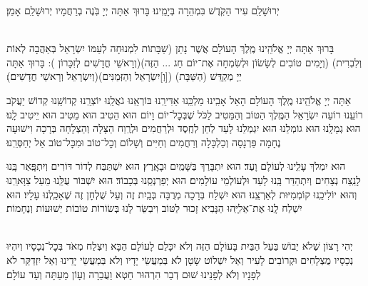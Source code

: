 \documentclass[twoside, openany, parskip=half, 11pt]{book}
\begin{document}
יְרוּשָׁלַ‍ִם עִיר הַקֹּֽדֶשׁ בִּמְהֵרָה בְּיָמֵֽינוּ׃ בָּרוּךְ אַתָּה יְיָ בֹּֽנֶה בְרַחֲמָיו יְרוּשָׁלַ‍ִם אָמֵן׃

\begin{sometimes}

\\
בָּרוּךְ אַתָּה יְיָ אֱלֹהֵֽינוּ מֶֽלֶךְ הָעוֹלָם אֲשֶׁר נָתַן (שַׁבָּתוֹת לִמְנוּחָה לְעַמּוֹ יִשְׂרָאֵל בְּאַהֲבָה לְאוֹת וְלִבְרִית)
(וְיָמִים טוֹבִים לְשָׂשׂוֹן וּלְשִׂמְחָה אֶת־יוֹם חַג ... הַזֶּה)(וְרָאשֵׁי חֳדָשִׁים לְזִכָּרוֹן ):
בָּרוּךְ אַתָּה יְיָ מְקַדֵּשׁ (הַשַּׁבָּת) ([וְ]יִשְׂרָאֵל וְהַזְּמַנִּים)(וְיִשְׂרָאֵל וְרָאשֵׁי חֳדָשִׁים׃)׃

\end{sometimes}


אַתָּה יְיָ אֱלֹהֵֽינוּ מֶֽלֶךְ הָעוֹלָם הָאֵל אָבִֽינוּ מַלְכֵּֽנוּ אַדִּירֵֽנוּ בּוֹרְאֵֽנוּ גֹאֲלֵֽנוּ יוֹצְרֵֽנוּ קְדוֹשֵֽׁנוּ קְדוֹשׁ יַעֲקֹב רוֹעֵֽנוּ רוֹעֵה יִשְׂרָאֵל הַמֶּֽלֶךְ הַטּוֹב וְהַמֵּטִיב לַכֹּל שֶׁבְּכׇל־יוֹם וָיוֹם הוּא הֵטִיב הוּא מֵטִיב הוּא יֵיטִיב לָֽנוּ׃ הוּא גְמָלָֽנוּ הוּא גוֹמְלֵנוּ הוּא יִגְמְלֵנוּ לָעַד לְחֵן לְחֶֽסֶד וּלְרַחֲמִים וּלְרֶֽוַח הַצָּלָה וְהַצְלָחָה בְּרָכָה וִישׁוּעָה נֶחָמָה פַּרְנָסָה וְכַלְכָּלָה וְרַחֲמִים וְחַיִּים וְשָׁלוֹם וְכׇל־טוֹב וּמִכׇּל־טוֹב אַל יְחַסְּרֵֽנוּ׃

הוּא יִמְלֹךְ עָלֵֽינוּ לְעוֹלָם וָעֶד׃
הוּא יִתְבָּרַךְ בַּשָּׁמַֽיִם וּבָאָֽרֶץ׃
הוּא יִשְׁתַּבַּח לְדוֹר דּוֹרִים וְיִתְפָּֽאַר בָּֽנוּ לָנֵֽצַח נְצָחִים
וְיִתְהַדַּר בָּֽנוּ לָעַד וּלְעוֹלְמֵי עוֹלָמִים׃
הוּא יְפַרְנְסֵֽנוּ בְּכָבוֹד׃
הוּא יִשְׁבּוֹר עֻלֵּֽנוּ מֵעַל צַוָּארֵֽנוּ וְהוּא יוֹלִיכֵֽנוּ קוֹמְמִיּוּת לְאַרְצֵֽנוּ׃
הוּא יִשְׁלַח בְּרָכָה מְרֻבָּה בְּבַֽיִת זֶה וְעַל שֻׁלְחָן זֶה שֶׁאָכַֽלְנוּ עָלָיו׃
הוּא יִשְׁלַח לָֽנוּ אֶת־אֵלִיָּֽהוּ הַנָּבִיא זָכוּר לַטּוֹב וִיבַשֵּׂר לָנוּ בְּשׂוֹרוֹת טוֹבוֹת יְשׁוּעוֹת וְנֶחָמוֹת׃


\begin{footnotesize}
\\
יְהִי רָצוֹן שֶׁלֹא יֵבוֹשׁ בַּעַל הַבַּיִת בָּעוֹלָם הַזֶּה וְלֹא יִכָּלֵם לָעוֹלָם הַבָּא וְיִצְלַח מְאֹד בְּכׇל־נְכָסָיו וְיִהְיוּ נְכָסָיו מֻצְלָחִים וּקְרוֹבִים לָעִיר וְאַל יִשְׁלוֹט שָׂטָן לֹא בְּמַעֲשֵׂי יָדָיו וְלֹא בְּמַעֲשֵׂי יָדֵינוּ וְאַל יִזְדַקֵּר לֹא לְפָנָיו וְלֹא לְפָנֵינוּ שׁוּם דְבַר הִרְהוּר חֵטְא וַעֲבֵרָה וְעָוֹן מֵעַתָּה וְעַד עוֹלָם׃

\end{footnotesize}
\end{document}
